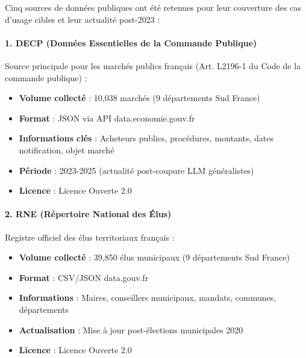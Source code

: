 Cinq sources de données publiques ont été retenues pour leur couverture des cas d'usage cibles et leur actualité post-2023 :

\paragraph{1. DECP (Données Essentielles de la Commande Publique)}

Source principale pour les marchés publics français (Art. L2196-1 du Code de la commande publique) :

\begin{itemize}
    \item \textbf{Volume collecté} : 10,038 marchés (9 départements Sud France)
    
    \item \textbf{Format} : JSON via API data.economie.gouv.fr
    
    \item \textbf{Informations clés} : Acheteurs publics, procédures, montants, dates notification, objet marché
    
    \item \textbf{Période} : 2023-2025 (actualité post-coupure LLM généralistes)
    
    \item \textbf{Licence} : Licence Ouverte 2.0
\end{itemize}

\paragraph{2. RNE (Répertoire National des Élus)}

Registre officiel des élus territoriaux français :

\begin{itemize}
    \item \textbf{Volume collecté} : 39,850 élus municipaux (9 départements Sud France)
    
    \item \textbf{Format} : CSV/JSON data.gouv.fr
    
    \item \textbf{Informations} : Maires, conseillers municipaux, mandats, communes, départements
    
    \item \textbf{Actualisation} : Mise à jour post-élections municipales 2020
    
    \item \textbf{Licence} : Licence Ouverte 2.0
\end{itemize}

